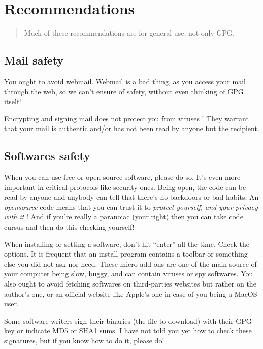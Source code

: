 \section{Recommendations}\label{recommendations}

\begin{quote}
Much of these recommendations are for general use, not only GPG.
\end{quote}

\subsection{Mail safety}

You ought to avoid webmail. Webmail is a bad thing, as you access your mail through the web, so we can't ensure of safety, without even
thinking of GPG itself!

Encrypting and signing mail does not protect you from viruses ! They
warrant that your mail is authentic and/or has not been read by anyone
but the recipient.

\subsection{Softwares safety}

When you can use free or open-source software, please do so. It's even more important in critical protocols like security ones. Being open, the code can be read by anyone and anybody can tell that there's no backdoors or bad habits. An \emph{opensource} code means that you can trust it to \emph{protect yourself, and your privacy with it} ! And if you're really a paranoiac (your right) then you can take code cursus and then do this checking yourself!

When installing or setting a software, don't hit ``enter'' all the time. Check the options. It is frequent that an install program contains a
toolbar or something else you did not ask nor need. These micro add-ons are one of the main source of your computer being slow, buggy, and can contain viruses or spy softwares. You also ought to avoid fetching softwares on third-parties websites but rather on the author's one, or an official website like Apple's one in case of you being a MacOS user.

Some software writers sign their binaries (the file to download) with their GPG key or indicate MD5 or SHA1 sums. I have not told you yet how to check these signatures, but if you know how to do it, please do!


